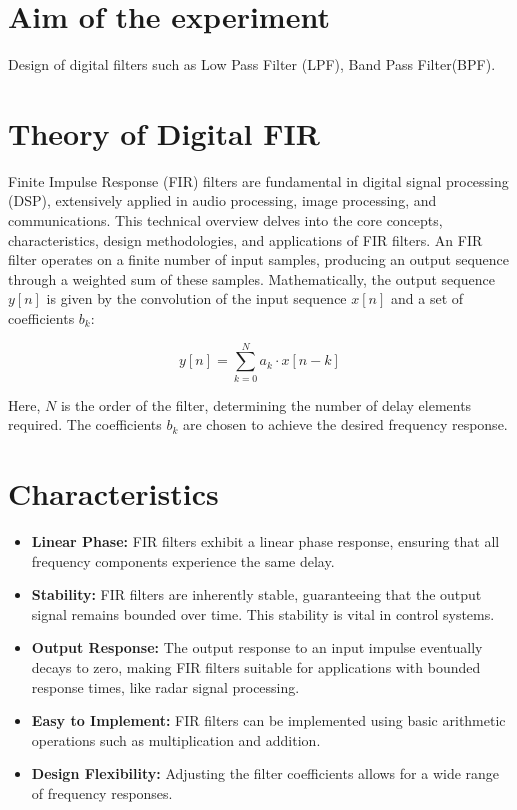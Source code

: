\documentclass[journal,12pt,onecolumn]{IEEEtran}
\theoremstyle{remark}
\begin{document}
\section{Aim of the experiment}
Design of digital filters such as Low Pass Filter (LPF), Band Pass Filter(BPF).
\section{Theory of Digital FIR}
Finite Impulse Response (FIR) filters are fundamental in digital signal processing (DSP), extensively applied in audio processing, image processing, and communications. This technical overview delves into the core concepts, characteristics, design methodologies, and applications of FIR filters. An FIR filter operates on a finite number of input samples, producing an output sequence through a weighted sum of these samples. Mathematically, the output sequence \(y[n]\) is given by the convolution of the input sequence \(x[n]\) and a set of coefficients \(b_k\):

\[ y[n] = \sum_{k=0}^{N} a_k \cdot x[n-k] \]

Here, \(N\) is the order of the filter, determining the number of delay elements required. The coefficients \(b_k\) are chosen to achieve the desired frequency response.

\section{Characteristics}

\begin{itemize}
    \item \textbf{Linear Phase:} FIR filters exhibit a linear phase response, ensuring that all frequency components experience the same delay.
    
    \item \textbf{Stability:} FIR filters are inherently stable, guaranteeing that the output signal remains bounded over time. This stability is vital in control systems.
    \item \textbf{Output Response:} The output response to an input impulse eventually decays to zero, making FIR filters suitable for applications with bounded response times, like radar signal processing.
    \item \textbf{Easy to Implement:} FIR filters can be implemented using basic arithmetic operations such as multiplication and addition. 
	\item \textbf{Design Flexibility:} Adjusting the filter coefficients allows for a wide range of frequency responses. 
\end{itemize}
\end{document}
